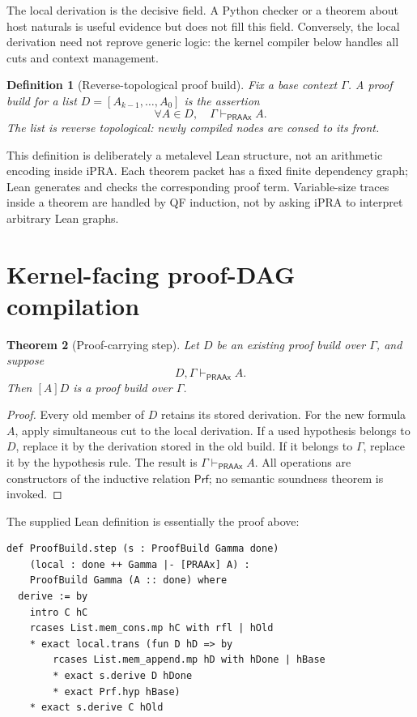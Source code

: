 \documentclass[11pt]{article}
\newtheorem{theorem}{Theorem}[section]
\newtheorem{definition}[theorem]{Definition}
\newcommand{\PRAAx}{\mathsf{PRAAx}}
\newcommand{\Prf}{\mathsf{Prf}}
\begin{document}
The local derivation is the decisive field.  A Python checker or a theorem
about host naturals is useful evidence but does not fill this field.  Conversely,
the local derivation need not reprove generic logic: the kernel compiler below
handles all cuts and context management.

\begin{definition}[Reverse-topological proof build]
Fix a base context \(\Gamma\).  A proof build for a list
\(D=[A_{k-1},\ldots,A_0]\) is the assertion
\[
  \forall A\in D,\quad \Gamma\vdash_{\PRAAx}A.
\]
The list is reverse topological: newly compiled nodes are consed to its front.
\end{definition}

This definition is deliberately a metalevel Lean structure, not an arithmetic
encoding inside iPRA.  Each theorem packet has a fixed finite dependency graph;
Lean generates and checks the corresponding proof term.  Variable-size traces
inside a theorem are handled by QF induction, not by asking iPRA to interpret
arbitrary Lean graphs.

\section{Kernel-facing proof-DAG compilation}
\label{sec:dag}

\begin{theorem}[Proof-carrying step]
\label{thm:step}
Let \(D\) be an existing proof build over \(\Gamma\), and suppose
\[
  D,\Gamma\vdash_{\PRAAx} A.
\]
Then \([A]D\) is a proof build over \(\Gamma\).
\end{theorem}

\begin{proof}
Every old member of \(D\) retains its stored derivation.  For the new formula
\(A\), apply simultaneous cut to the local derivation.  If a used hypothesis
belongs to \(D\), replace it by the derivation stored in the old build.  If it
belongs to \(\Gamma\), replace it by the hypothesis rule.  The result is
\(\Gamma\vdash_{\PRAAx}A\).  All operations are constructors of the
inductive relation \(\Prf\); no semantic soundness theorem is invoked.
\end{proof}

The supplied Lean definition is essentially the proof above:

\begin{lstlisting}[language={}]
def ProofBuild.step (s : ProofBuild Gamma done)
    (local : done ++ Gamma |- [PRAAx] A) :
    ProofBuild Gamma (A :: done) where
  derive := by
    intro C hC
    rcases List.mem_cons.mp hC with rfl | hOld
    * exact local.trans (fun D hD => by
        rcases List.mem_append.mp hD with hDone | hBase
        * exact s.derive D hDone
        * exact Prf.hyp hBase)
    * exact s.derive C hOld
\end{lstlisting}
\end{document}
